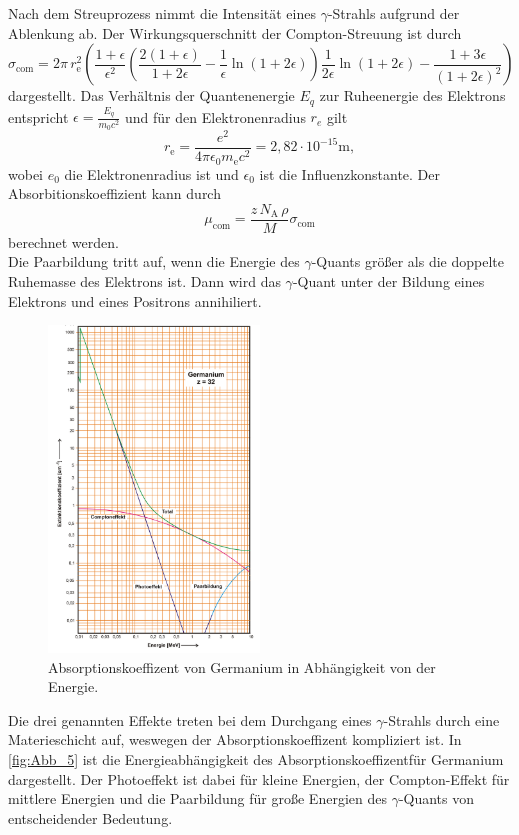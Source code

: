 Nach dem Streuprozess nimmt die Intensität eines $\gamma$-Strahls aufgrund der Ablenkung ab. 
Der Wirkungsquerschnitt der Compton-Streuung ist durch
\begin{equation*}
    \sigma_\mathrm{com}=2\pi\,r_\mathrm{e}^2\left(\frac{1+\epsilon}{\epsilon^2}\left(\frac{2(1+\epsilon)}{1+2\epsilon}-\frac{1}{\epsilon}\ln(1+2\epsilon) \right)\frac{1}{2\epsilon}\ln(1+2\epsilon)-\frac{1+3\epsilon}{(1+2\epsilon)^2}\right)
\end{equation*}
dargestellt. Das Verhältnis der Quantenenergie $E_q$ zur Ruheenergie des Elektrons entspricht $\epsilon = \frac{E_q}{m_0c^2}$ 
und für den Elektronenradius $r_e$ gilt
\begin{equation*}
    r_\mathrm{e}=\frac{e^2}{4\pi\epsilon_0 m_\mathrm{e}c^2}=2,82\cdot10^{-15}\si{\meter},
\end{equation*}
wobei $e_0$ die Elektronenradius ist und $\epsilon_0$ ist die Influenzkonstante.
Der Absorbitionskoeffizient kann durch
\begin{equation}
    \mu_\mathrm{com}=\frac{z\,N_\mathrm{A}\,\rho}{M}\sigma_\mathrm{com}
    \label{eqn:Absorbitionskoeffizient}
\end{equation}
berechnet werden.\\
Die Paarbildung tritt auf, wenn die Energie des $\gamma$-Quants größer als die doppelte Ruhemasse des Elektrons ist.
Dann wird das $\gamma$-Quant unter der Bildung eines Elektrons und eines Positrons annihiliert.\\
\begin{figure}[H]
    \centering
    \includegraphics[width=0.5\textwidth]{build/Abb_5.png}
    \caption {Absorptionskoeffizent von Germanium in Abhängigkeit von der Energie\cite[236]{V704}.}
    \label{fig:Abb_5}
\end{figure}
Die drei genannten Effekte treten bei dem Durchgang eines $\gamma$-Strahls durch eine Materieschicht auf, weswegen der Absorptionskoeffizent kompliziert ist.
In \autoref{fig:Abb_5} ist die Energieabhängigkeit des Absorptionskoeffizentfür Germanium dargestellt.
Der Photoeffekt ist dabei für kleine Energien, der Compton-Effekt für mittlere Energien und die Paarbildung für große Energien des $\gamma$-Quants
von entscheidender Bedeutung.

